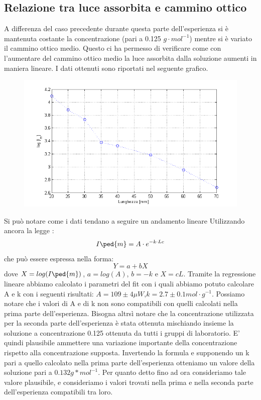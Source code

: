 \documentclass[a4paper,11pt]{article}
\begin{document}
\subsection{Relazione tra luce assorbita e cammino ottico}
A differenza del caso precedente durante questa parte dell'esperienza si è mantenuta costante la concentrazione (pari a 0.125 $g\cdot mol^{-1}$) mentre si è variato il cammino ottico medio.
Questo ci ha permesso di verificare come con l'aumentare del cammino ottico medio la luce assorbita dalla soluzione aumenti in maniera lineare.
I dati ottenuti sono riportati nel seguente grafico.
\vspace{2000 pt}
 \begin{center} 
\begin{figure}[htpd]
\hspace{0 pt}
\includegraphics[scale=0.80]{grafico2.png}
\end{figure}
\end{center}
Si può notare come i dati tendano a seguire un andamento lineare
Utilizzando ancora la legge : $$I\ped{m}=A\cdot e^{-k\cdot Lc}$$
che può essere espressa nella forma: $$Y=a+bX$$ dove $X=log(I\ped{m})$, $a=log(A)$, $b=-k$ e $X=cL$. 
Tramite la regressione lineare abbiamo calcolato i parametri del fit con i quali abbiamo potuto calcolare A e k con i seguenti risultati:
 $A = 109  \pm 4 \mu W $,$k = 2.7 \pm 0.1 mol\cdot g^{-1}$.
 Possiamo notare che i valori di A e di k non sono compatibili con quelli calcolati nella prima parte dell'esperienza. Bisogna altrsì notare che la concentrazione utilizzata per la seconda parte dell'esperienza è stata ottenuta mischiando insieme la soluzione a concentrazione 0.125 ottenuta da tutti i gruppi di laboratorio. E' quindi plausibile ammettere una variazione importante della concentrazione rispetto alla concentrazione supposta. Invertendo la formula e supponendo un k pari a quello calcolato nella prima parte dell'esperienza otteniamo un valore della soluzione pari a $0.132 g*mol^{-1}$. Per quanto detto fino ad ora consideriamo tale valore plausibile, e consideriamo i valori trovati nella prima e nella seconda parte dell'esperienza compatibili tra loro.
 
\end{document}
